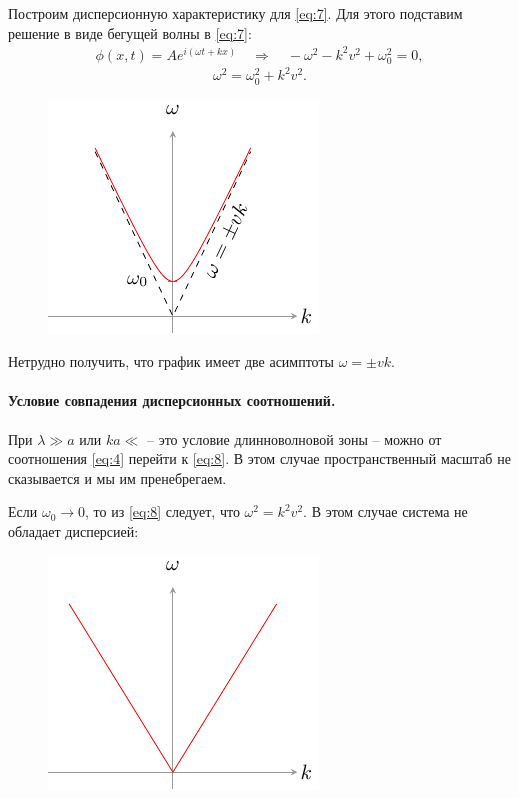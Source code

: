 Построим дисперсионную характеристику для \eqref{eq:7}. Для этого подставим решение в виде бегущей волны в \eqref{eq:7}:
\begin{gather*}
	\phi(x,t)=Ae^{i(\omega t + kx)} \quad \Rightarrow \quad -\omega^2-k^2v^2+\omega_0^2=0,
\end{gather*}
\begin{equation}
	\omega^2 = \omega_0^2 + k^2v^2.
	\label{eq:8}
\end{equation}
\begin{figure}[H]
	\centering
	\includegraphics[scale=1.5]{img/osci_and_wave_in_ordered_struct/disp_of_cont}
\end{figure}
Нетрудно получить, что график имеет две асимптоты $\omega=\pm vk$. 

\paragraph{Условие совпадения дисперсионных соотношений. } При $\lambda\gg a$ или $ka\ll$ -- это условие длинноволновой зоны -- можно от соотношения \eqref{eq:4} перейти к \eqref{eq:8}. В этом случае пространственный масштаб не сказывается и мы им пренебрегаем. 

Если  $\omega_0 \rightarrow 0$, то из \eqref{eq:8} следует, что $\omega^2=k^2v^2$. В этом случае система не обладает дисперсией:

\begin{figure}[H]
	\centering
	\includegraphics[scale=1.5]{img/osci_and_wave_in_ordered_struct/no_disp} 
\end{figure}


